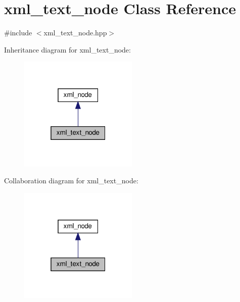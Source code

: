 \hypertarget{classxml__text__node}{}\section{xml\+\_\+text\+\_\+node Class Reference}
\label{classxml__text__node}


{\ttfamily \#include $<$xml\+\_\+text\+\_\+node.\+hpp$>$}



Inheritance diagram for xml\+\_\+text\+\_\+node\+:
\nopagebreak
\begin{figure}[H]
\begin{center}
\leavevmode
\includegraphics[width=160pt]{d7/d9a/classxml__text__node__inherit__graph}
\end{center}
\end{figure}


Collaboration diagram for xml\+\_\+text\+\_\+node\+:
\nopagebreak
\begin{figure}[H]
\begin{center}
\leavevmode
\includegraphics[width=160pt]{da/d82/classxml__text__node__coll__graph}
\end{center}
\end{figure}
